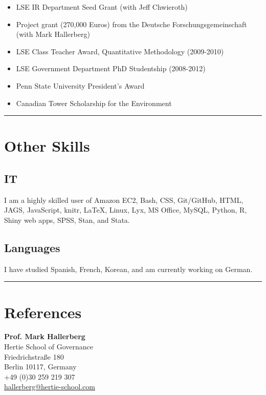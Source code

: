 \documentclass[a4paper]{article}
\begin{document}
{{\begin{itemize}

	\item LSE IR Department Seed Grant (with Jeff Chwieroth)
	\item Project grant (270,000 Euros) from the Deutsche Forschungsgemeinschaft (with Mark Hallerberg)
	\item LSE Class Teacher Award, Quantitative Methodology (2009-2010)
    \item LSE Government Department PhD Studentship (2008-2012)
	\item Penn State University President's Award
	\item Canadian Tower Scholarship for the Environment

\end{itemize}

\vspace{0.5cm}
\medskip\hrule height 1pt
\vspace{0.5cm}

\section*{Other Skills}

\subsection*{IT}

I am a highly skilled user of Amazon EC2, Bash, CSS, Git/GitHub, HTML, JAGS, JavaScript, knitr, LaTeX, Linux, Lyx, MS Office, MySQL, Python, R, Shiny web apps, SPSS, Stan, and Stata.

\subsection*{Languages}

I have studied Spanish, French, Korean, and am currently working on German.


\vspace{0.5cm}
\medskip\hrule height 1pt
\vspace{0.5cm}

\section*{References}

\noindent \textbf{Prof. Mark Hallerberg} \\
Hertie School of Governance\\
Friedrichstra{\ss}e 180\\
Berlin 10117, Germany \\
+49 (0)30 259 219 307 \\
\href{mailto:hallerberg@hertie-school.com}{hallerberg@hertie-school.com}\\

}}
\end{document}

